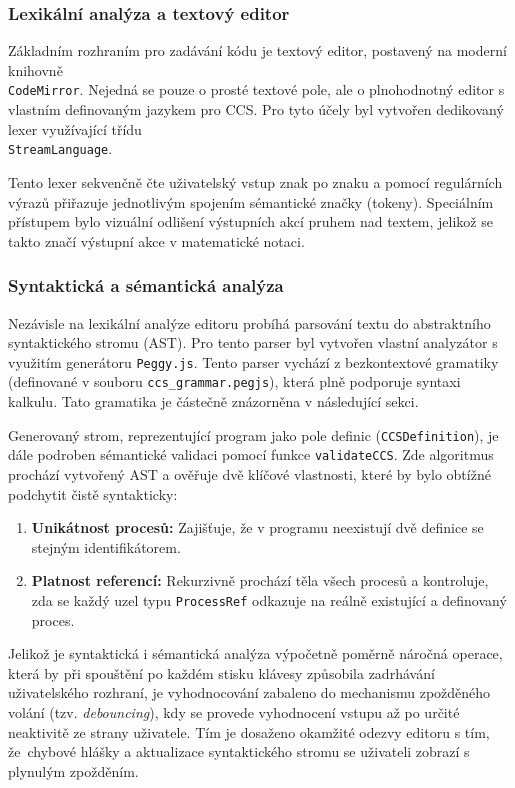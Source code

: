 \subsubsection*{Lexikální analýza a textový editor}
Základním rozhraním pro zadávání kódu je textový editor, postavený na moderní knihovně\\\texttt{CodeMirror}. 
Nejedná se pouze o prosté textové pole, ale o plnohodnotný editor s vlastním definovaným jazykem pro CCS. 
Pro tyto účely byl vytvořen dedikovaný lexer využívající třídu\\\texttt{StreamLanguage}. 

Tento lexer sekvenčně čte uživatelský vstup znak po znaku a pomocí regulárních výrazů přiřazuje jednotlivým spojením sémantické značky (tokeny). 
Speciálním přístupem bylo vizuální odlišení výstupních akcí pruhem nad textem, jelikož se takto značí výstupní akce v matematické notaci.

\subsubsection*{Syntaktická a sémantická analýza}
Nezávisle na lexikální analýze editoru probíhá parsování textu do abstraktního syntaktického stromu (AST). 
Pro tento parser byl vytvořen vlastní analyzátor s využitím generátoru \texttt{Peggy.js}. 
Tento parser vychází z bezkontextové gramatiky (definované v souboru \texttt{ccs\_grammar.pegjs}), která plně podporuje syntaxi kalkulu. 
Tato gramatika je částečně znázorněna v následující sekci.

Generovaný strom, reprezentující program jako pole definic (\texttt{CCSDefinition}), je dále podroben sémantické validaci pomocí funkce \texttt{validateCCS}. 
Zde algoritmus prochází vytvořený AST a ověřuje dvě klíčové vlastnosti, které by bylo obtížné podchytit čistě syntakticky:
\begin{enumerate}
    \item \textbf{Unikátnost procesů:} Zajišťuje, že v programu neexistují dvě definice se stejným identifikátorem.
    \item \textbf{Platnost referencí:} Rekurzivně prochází těla všech procesů a kontroluje, zda se každý uzel typu \texttt{ProcessRef} odkazuje na reálně existující a definovaný proces.
\end{enumerate}

Jelikož je syntaktická i sémantická analýza výpočetně poměrně náročná operace, která by při spouštění po každém stisku klávesy způsobila zadrhávání uživatelského rozhraní, 
je vyhodnocování zabaleno do mechanismu zpožděného volání (tzv. \textit{debouncing}), kdy se provede vyhodnocení vstupu až po určité neaktivitě ze strany uživatele.
Tím je dosaženo okamžité odezvy editoru s tím, že~chybové hlášky a aktualizace syntaktického stromu se uživateli zobrazí s plynulým zpožděním.

